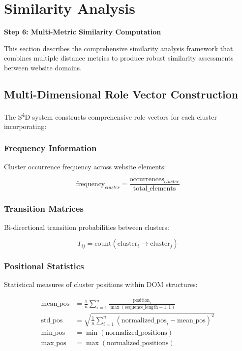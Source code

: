 \section{Similarity Analysis}
\label{sec:similarity-analysis}

\textbf{Step 6: Multi-Metric Similarity Computation}

This section describes the comprehensive similarity analysis framework that combines multiple distance metrics to produce robust similarity assessments between website domains.

\subsection{Multi-Dimensional Role Vector Construction}
\label{subsec:role-vectors}

The S\textsuperscript{4}D system constructs comprehensive role vectors for each cluster incorporating:

\subsubsection{Frequency Information}
Cluster occurrence frequency across website elements:

\begin{equation}
\text{frequency}_{cluster} = \frac{\text{occurrences}_{cluster}}{\text{total\_elements}}
\end{equation}

\subsubsection{Transition Matrices}
Bi-directional transition probabilities between clusters:

\begin{equation}
T_{ij} = \text{count}(\text{cluster}_i \rightarrow \text{cluster}_j)
\end{equation}

\subsubsection{Positional Statistics}
Statistical measures of cluster positions within DOM structures:

\begin{align}
\text{mean\_pos} &= \frac{1}{n} \sum_{i=1}^{n} \frac{\text{position}_i}{\max(\text{sequence\_length} - 1, 1)} \\
\text{std\_pos} &= \sqrt{\frac{1}{n} \sum_{i=1}^{n} (\text{normalized\_pos}_i - \text{mean\_pos})^2} \\
\text{min\_pos} &= \min(\text{normalized\_positions}) \\
\text{max\_pos} &= \max(\text{normalized\_positions})
\end{align}

